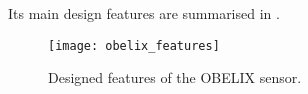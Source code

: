 Its main design features are summarised in .


\begin{figure}[h!]
\centering
\texttt{[image: obelix\_features]}
\caption{Designed features of the OBELIX sensor.}
\label{fig:obelix_features}
\end{figure}





\begin{comment}
\section{Mechanical structure}


\end{comment}







